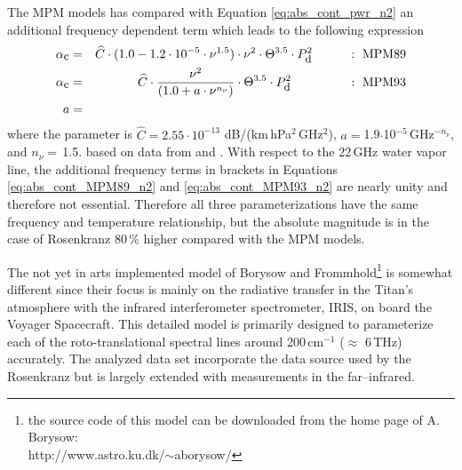The MPM models has compared with Equation \ref{eq:abs_cont_pwr_n2} 
an additional frequency dependent term which leads to the 
following expression
\begin{eqnarray}
  \label{eq:abs_cont_MPM89_n2}
    \alphac &=& \widehat{C} \cdot (1.0-1.2\cdot10^{-5}\cdot
               \nu^{1.5}) \cdot \nu^2 \cdot \Theta^{3.5} \cdot \pda^2
               \hspace*{10mm}:~\mbox{MPM89}\\
%
  \label{eq:abs_cont_MPM93_n2}
    \alphac &=& \widehat{C} \cdot \frac{\nu^2}{(1.0+a\cdot \nu^{n_{\nu}})} 
                \cdot \Theta^{3.5} \cdot \pda^2
                \hspace*{16mm}:~\mbox{MPM93}\\
          a &=&  
\nonumber
\end{eqnarray}
where the parameter is $\widehat{C} = 2.55\cdot 10^{-13}$ dB/(km\,hPa$^2$\,GHz$^2$), 
$a=$1.9$\cdot$10$^{-5}$\,GHz$^{-n_{\nu}}$, and $n_{\nu}=$\,1.5.
based on data from \citet{stankevich:74} and \citet{stonenw:84}. 
With respect to the 22\,GHz water vapor line, 
the additional frequency terms in brackets in 
Equations \ref{eq:abs_cont_MPM89_n2} and \ref{eq:abs_cont_MPM93_n2}
are nearly unity and therefore not essential. Therefore all
three parameterizations have the same frequency and temperature
relationship, but the absolute magnitude is in the case of Rosenkranz
80\,\% higher compared with the MPM models.

The not yet in arts implemented model of Borysow and 
Frommhold\footnote{{the source code of this
  model can be downloaded from the home page of A. Borysow:}\\
  http://www.astro.ku.dk/$\sim$aborysow/} is somewhat different since their 
focus is mainly on the radiative transfer in the Titan's atmosphere
with the infrared interferometer spectrometer, IRIS, on board the
Voyager Spacecraft. This detailed model is primarily
designed to parameterize each of the roto-translational spectral lines 
around 200\,cm$^{-1}$ ($\approx$ 6\,THz) accurately. The analyzed data
set incorporate the data source used by the Rosenkranz but is largely 
extended with measurements in the far--infrared.



